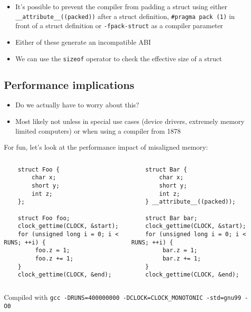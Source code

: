 \documentclass{beamer}
\begin{document}
\begin{frame}[fragile]{\insertsection}{\insertsubsection}
    \begin{itemize}
        \item It's possible to prevent the compiler from padding a struct using either
            \verb|__attribute__((packed))| after a struct definition, \verb|#pragma pack (1)| in
            front of a struct definition or \verb|-fpack-struct| as a compiler parameter\pause
        \item Either of these generate an incompatible ABI
        \item We can use the \verb|sizeof| operator to check the effective size of a struct
    \end{itemize}
\end{frame}

\subsection{Performance implications}
\begin{frame}{\insertsection}{\insertsubsection}
	\begin{itemize}
        \item Do we actually have to worry about this?\pause
        \item Most likely not unless in special use cases (device drivers, extremely memory
            limited computers) or when using a compiler from 1878
	\end{itemize}
\end{frame}

\begin{frame}[fragile]{\insertsection}{\insertsubsection}
    For fun, let's look at the performance impact of misaligned memory:
    \begin{columns}[]
            \begin{verbatim}
    struct Foo {
        char x;
        short y;
        int z;
    };

    struct Foo foo;
    clock_gettime(CLOCK, &start);
    for (unsigned long i = 0; i < RUNS; ++i) {
         foo.z = 1;
         foo.z += 1;
    }
    clock_gettime(CLOCK, &end);
            \end{verbatim}

            \begin{verbatim}
    struct Bar {
        char x;
        short y;
        int z;
    } __attribute__((packed));

    struct Bar bar;
    clock_gettime(CLOCK, &start);
    for (unsigned long i = 0; i < RUNS; ++i) {
         bar.z = 1;
         bar.z += 1;
    }
    clock_gettime(CLOCK, &end);
            \end{verbatim}
    \end{columns}
    \begin{block}{Compiled with}
        \small \verb|gcc -DRUNS=400000000 -DCLOCK=CLOCK_MONOTONIC -std=gnu99 -O0|
    \end{block}
\end{frame}
\end{document}
